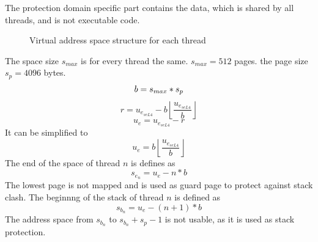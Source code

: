 The protection domain specific part contains the data, which is shared by all threads, and is not executable code.
\begin{figure}
    \centering
    \caption{Virtual address space structure for each thread}
    \label{fig:userspace_pd}
\end{figure}

The space size $s_{max}$ is for every thread the same.
$s_{max} = 512$ pages. the page size $s_p  = 4096$ bytes.
\begin{equation}
    b = s_{max} * s_p \\\\
\end{equation}
\begin{equation}
    r = u_{e_{seL4}} - b \left \lfloor \frac{u_{e_{seL4}}}{b} \right \rfloor
\end{equation}
\begin{equation}
    u_e = u_{e_{seL4}} - r
\end{equation}
It can be simplified to
\begin{equation}
    u_e = b \left \lfloor \frac{u_{e_{seL4}}}{b} \right \rfloor
\end{equation}
The end of the space of thread $n$ is defines as
\begin{equation}
    s_{e_n} = u_e - n * b
\end{equation}
The lowest page is not mapped and is used as guard page to protect against stack clash.
The beginnng of the stack of thread $n$ is defined as
\begin{equation}
    s_{b_n} = u_e - (n + 1) * b
\end{equation}
The address space from $s_{b_n}$ to $s_{b_n} + s_p - 1$ is not usable, as it is used
as stack protection.

